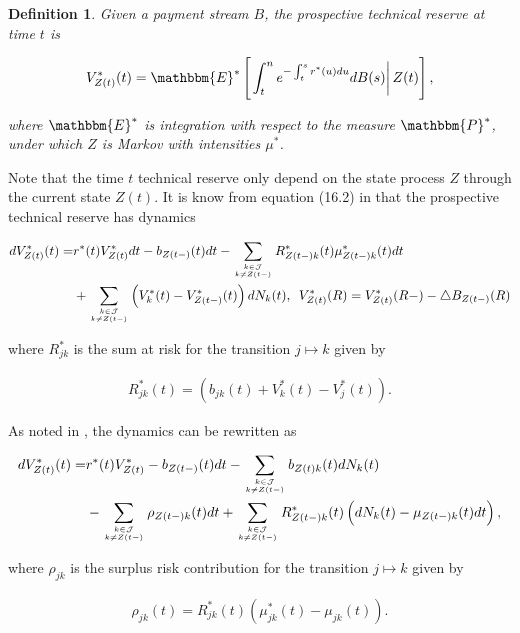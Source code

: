 \documentclass{article}
\newcommand{\1}[1]{\mathbbm{1}_{\left\lbrace #1 \right\rbrace}}
\newcommand{\econdStar}[2][def]{\mathbbm{E}^* \left[ \left. #1 \right| #2 \right]}
\theoremstyle{break}
\newtheorem{definition}{Definition}[section]
\theoremstyle{remark}
\numberwithin{equation}{section}
\begin{document}
\begin{definition}
	Given a payment stream $B$, the prospective technical reserve at time $t$ is
	
	\begin{align*}
		V_{Z(t)}^*(t) = \econdStar[\int_t^n e^{-\int_t^s r^*(u)du} dB(s)]{Z(t)},
	\end{align*}
	
	where $\mathbbm{E}^*$ is integration with respect to the measure $\mathbbm{P}^*$, under which $Z$ is Markov with intensities $\mu^*$.
\end{definition}

Note that the time $t$ technical reserve only depend on the state process $Z$ through the current state $Z(t)$. It is know from equation (16.2) in \cite{LivStok} that the prospective technical reserve has dynamics

\begin{align*}
	dV_{Z(t)}^*(t) =& r^*(t) V_{Z(t)}^* dt - b_{Z(t-)}(t) dt - \sum_{k \in \mathcal{J} \atop k \neq Z(t-)} R_{Z(t-)k}^*(t) \mu_{Z(t-)k}^*(t) dt \\
	&+ \sum_{k \in \mathcal{J} \atop k \neq Z(t-)} \left( V_k^*(t) - V_{Z(t-)}^*(t) \right) dN_k(t), \, \, \, V_{Z(t)}^*(R) =  V_{Z(t)}^*(R-) - \triangle B_{Z(t-)}(R)
\end{align*}

where $R_{jk}^*$ is the sum at risk for the transition $j \mapsto k$ given by

\begin{align*}
	R_{jk}^*(t) = \left( b_{jk}(t) + V_{k}^*(t) - V_{j}^*(t) \right).
\end{align*}

As noted in \cite{Lollike}, the dynamics can be rewritten as

\begin{align} \label{ReserveDynamics}
\begin{split}
	dV_{Z(t)}^*(t) =& r^*(t) V_{Z(t)}^* - b_{Z(t-)}(t) dt - \sum_{k \in \mathcal{J} \atop k \neq Z(t-)} b_{Z(t)k}(t) dN_k(t) \\
	&- \sum_{k \in \mathcal{J} \atop k \neq Z(t-)} \rho_{Z(t-)k}(t) dt + \sum_{k \in \mathcal{J} \atop k \neq Z(t-)} R_{Z(t-)k}^*(t) \left( dN_k(t) - \mu_{Z(t-)k}(t) dt \right),
\end{split}
\end{align}

where $\rho_{jk}$ is the surplus risk contribution for the transition $j \mapsto k$ given by

\begin{align*}
	\rho_{jk}(t) = R_{jk}^*(t) \left( \mu_{jk}^*(t) - \mu_{jk}(t) \right).
\end{align*}
\end{document}

